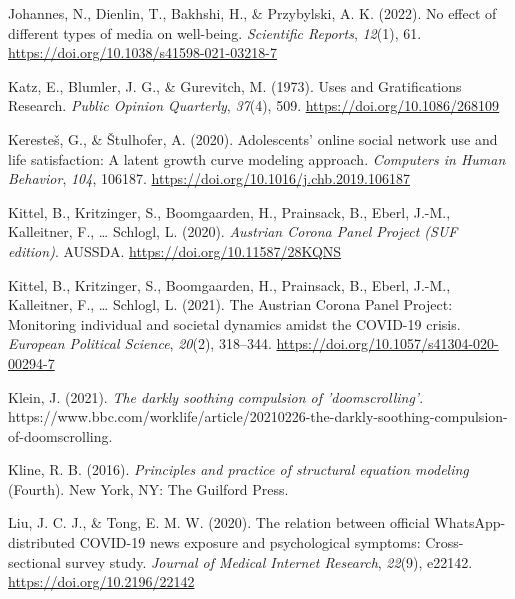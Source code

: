 \documentclass[
  man,mask]{apa6}
\newlength{\cslhangindent}
\newlength{\cslentryspacingunit} %
\newenvironment{CSLReferences}[2] %
 {%
  \setlength{\parindent}{0pt}
  \ifodd #1
  \let\oldpar\par
  \def\par{\hangindent=\cslhangindent\oldpar}
  \fi
  \setlength{\parskip}{#2\cslentryspacingunit}
 }%
 {}
\begin{document}
\begin{CSLReferences}{1}{0}
\leavevmode{}%
Johannes, N., Dienlin, T., Bakhshi, H., \& Przybylski, A. K. (2022). No effect of different types of media on well-being. \emph{Scientific Reports}, \emph{12}(1), 61. \url{https://doi.org/10.1038/s41598-021-03218-7}

\leavevmode{}%
Katz, E., Blumler, J. G., \& Gurevitch, M. (1973). Uses and {Gratifications Research}. \emph{Public Opinion Quarterly}, \emph{37}(4), 509. \url{https://doi.org/10.1086/268109}

\leavevmode{}%
Keresteš, G., \& Štulhofer, A. (2020). Adolescents' online social network use and life satisfaction: {A} latent growth curve modeling approach. \emph{Computers in Human Behavior}, \emph{104}, 106187. \url{https://doi.org/10.1016/j.chb.2019.106187}

\leavevmode{}%
Kittel, B., Kritzinger, S., Boomgaarden, H., Prainsack, B., Eberl, J.-M., Kalleitner, F., \ldots{} Schlogl, L. (2020). \emph{Austrian {Corona Panel Project} ({SUF} edition)}. {AUSSDA}. \url{https://doi.org/10.11587/28KQNS}

\leavevmode{}%
Kittel, B., Kritzinger, S., Boomgaarden, H., Prainsack, B., Eberl, J.-M., Kalleitner, F., \ldots{} Schlogl, L. (2021). The {Austrian Corona Panel Project}: Monitoring individual and societal dynamics amidst the {COVID-19} crisis. \emph{European Political Science}, \emph{20}(2), 318--344. \url{https://doi.org/10.1057/s41304-020-00294-7}

\leavevmode{}%
Klein, J. (2021). \emph{The darkly soothing compulsion of 'doomscrolling'}. https://www.bbc.com/worklife/article/20210226-the-darkly-soothing-compulsion-of-doomscrolling.

\leavevmode{}%
Kline, R. B. (2016). \emph{Principles and practice of structural equation modeling} (Fourth). {New York, NY}: {The Guilford Press}.

\leavevmode{}%
Liu, J. C. J., \& Tong, E. M. W. (2020). The relation between official {WhatsApp-distributed COVID-19} news exposure and psychological symptoms: Cross-sectional survey study. \emph{Journal of Medical Internet Research}, \emph{22}(9), e22142. \url{https://doi.org/10.2196/22142}


\end{CSLReferences}
\end{document}
